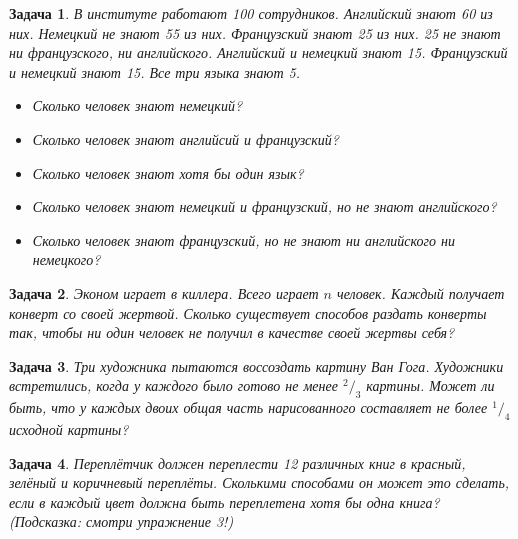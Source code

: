 \documentclass[12pt, a4paper]{article}
\newtheorem{problem}{Задача}
\begin{document}
\begin{problem}
В институте работают 100 сотрудников. Английский знают 60 из них. Немецкий не знают 55 из них. Французский знают 25 из них. 25 не знают ни французского, ни английского. Английский и немецкий знают 15. Французский и немецкий знают 15. Все три языка знают 5. 
\begin{itemize}
\item Сколько человек знают немецкий?
\item Сколько человек знают английсий и французский? 
\item Сколько человек знают хотя бы один язык?
\item Сколько человек знают немецкий и французский, но не знают английского?
\item Сколько человек знают французский, но не знают ни английского ни немецкого?
\end{itemize}
\begin{sol}

\end{sol}
\end{problem}



\begin{problem}
Эконом играет в киллера. Всего играет $n$ человек. Каждый получает конверт со своей жертвой. Сколько существует способов раздать конверты так, чтобы ни один человек не получил в качестве своей жертвы себя? 
\begin{sol}

\end{sol}
\end{problem}



\begin{problem}
Три художника пытаются воссоздать картину Ван Гога. Художники встретились, когда у каждого было готово не менее $^2/_3$ картины. Может ли быть, что у каждых двоих общая часть нарисованного составляет не более $^1/_4$ исходной картины?
\begin{sol}

\end{sol}
\end{problem}



\begin{problem}
Переплётчик должен переплести 12 различных книг в красный, зелёный и коричневый переплёты. Сколькими способами он может это сделать, если в каждый цвет должна быть переплетена хотя бы одна книга? (Подсказка: смотри упражнение 3!)
\begin{sol}

\end{sol}
\end{problem}
\end{document}
